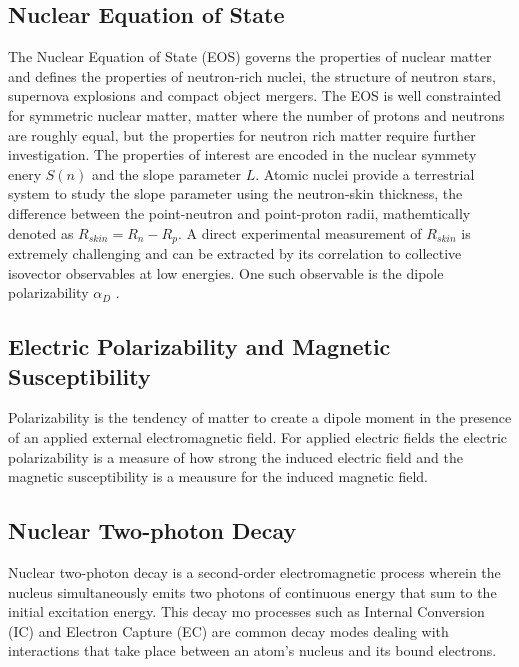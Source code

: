 \documentclass[cnatzke_thesis_proposal.tex]{subfiles}
\begin{document}
    \subsection{Nuclear Equation of State}
The Nuclear Equation of State (EOS) governs the properties of nuclear matter and defines the properties of neutron-rich nuclei, the structure of neutron stars, supernova explosions and compact object mergers. \cite{Kaufmann2020} The EOS is well constrainted for symmetric nuclear matter, matter where the number of protons and neutrons are roughly equal, but the properties for neutron rich matter require further investigation. \cite{Danielewicz2002} The properties of interest are encoded in the nuclear symmety enery $S(n)$ and the slope parameter $L$. Atomic nuclei provide a terrestrial system to study the slope parameter using the neutron-skin thickness, the difference between the point-neutron and point-proton radii, mathemtically denoted as $R_{skin} = R_n - R_p$. \cite{Tsang2012} A direct experimental measurement of $R_{skin}$ is extremely challenging and can be extracted by its correlation to collective isovector observables at low energies. \cite{Birkhan2017} One such observable is the dipole polarizability $\alpha_D$ \cite{Birkhan2017}.

    \subsection{Electric Polarizability and Magnetic Susceptibility}
Polarizability is the tendency of matter to create a dipole moment in the presence of an applied external electromagnetic field. For applied electric fields the electric polarizability is a measure of how strong the induced electric field and the magnetic susceptibility is a meausure for the induced magnetic field. 


    \subsection{Nuclear Two-photon Decay}

    Nuclear two-photon decay is a second-order electromagnetic process wherein the nucleus simultaneously emits two photons of continuous energy that sum to the initial excitation energy. \cite{Kramp1987} This decay mo processes such as Internal Conversion (IC) and Electron Capture (EC) are common decay modes dealing with interactions that take place between an atom's nucleus and its bound electrons.
\end{document}
